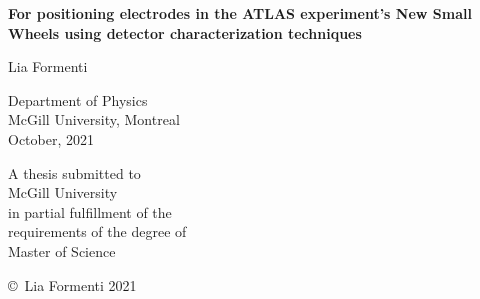 \pagestyle{empty}

\begin{titlepage}
        \begin{center}
        \vspace*{1.0cm}

        \Huge
        {\bf For positioning electrodes in the ATLAS experiment's New Small Wheels using detector characterization techniques} \\

        \vspace*{1.0cm}

        \Large
        Lia Formenti \\
        
        \vspace*{1.0cm}
        
        \normalsize
        Department of Physics \\
        McGill University, Montreal \\
        October, 2021 \\

        \vspace*{3.0cm}

        \normalsize
        A thesis submitted to\\
        McGill University \\ 
        in partial fulfillment of the \\
        requirements of the degree of \\
        Master of Science \\

        \vspace*{2.0cm}

        \copyright\ Lia Formenti 2021 \\
        \end{center}
\end{titlepage}

\pagestyle{plain}
\setcounter{page}{2}

\cleardoublepage %

